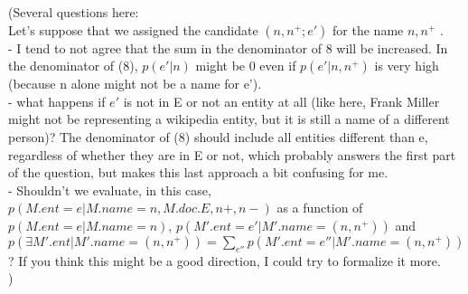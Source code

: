 \documentclass{article}
\begin{document}
{\color{blue} (Several questions here:\\
Let's suppose that we assigned the candidate $(n,n^+ ; e')$ for the name $n,n^+$ .\\
- I tend to not agree that the sum in the denominator of 8 will be increased. In the denominator of (8), $p(e'|n)$ might be 0 even if $p(e' | n,n^+)$ is very high (because n alone might not be a name for e').\\
- what happens if $e'$ is not in E or not an entity at all (like here, Frank Miller might not be representing a wikipedia entity, but it is still a name of a different person)? The denominator of (8) should include all entities different than e, regardless of whether they are in E or not, which probably answers the first part of the question, but makes this last approach a bit confusing for me. \\
- Shouldn't we evaluate, in this case, $p(M.ent =e | M.name=n, M.doc.E, n+, n-)$ as a function of $p(M.ent =e | M.name=n)$, $p(M'.ent = e' | M'.name=(n,n^+))$ and $p(\exists M'.ent | M'.name=(n,n^+)) = \sum\limits_{e''} p(M'.ent =e'' | M'.name=(n,n^+))$ ? If you think this might be a good direction, I could try to formalize it more.\\
)}
\end{document}
